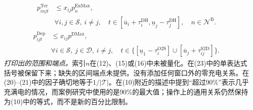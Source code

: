 \documentclass{article}
\begin{document}
\begin{equation}
\begin{aligned}
p^{\mathrm{Ter}}_{injt}&\leq x_{ij}p_n^{\mathrm{EnMax}},\\
&\forall i,j\in\mathcal S,\ i\ne j,\quad
 t\in[\overline u_i+\tau_i^{\mathrm{DH}},\underline u_j-\tau_j^{\mathrm{DH}}],\quad
 n\in\mathcal N^{\mathrm B}.
\end{aligned}\tag{22}
\end{equation}
\begin{equation}
\begin{aligned}
p^{\mathrm{Dep}}_{ijt}&\leq x_{ij}p^{\mathrm{DMax}},\\
&\forall i\in\mathcal S,\ j\in\mathcal D,\ i\ne j,\quad
 t\in\{[\underline u_1-\tau_i^{\mathrm{O2S}}]\cup[\overline u_j+\tau_{ij}^{\mathrm{S2D}}]\}.
\end{aligned}\tag{23}
\end{equation}
\noindent\emph{打印出的范围和端点。}索引\(n\)在(12)、(15)或(16)中未被量化。在(23)中的单表达式括号被保留下来；缺失的区间端点未提供。没有添加任何窗口外的零充电关系。在(20)--(21)中的因子确切地等于\(1/|\mathcal T|\)。在(10)附近的描述中提到“超过90\%”表示几乎充满电的情况，而案例研究中使用的是90\%的最大值；操作上的通用关系仍然保持为(10)中的等式，而不是新的百分比限制。
\end{document}
